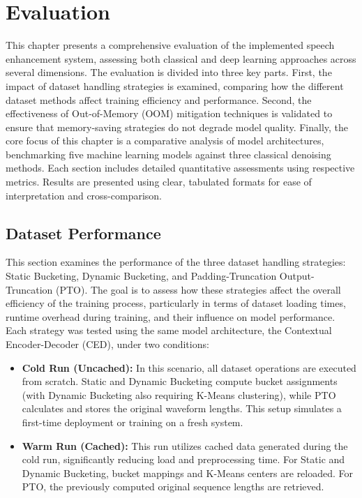 \graphicspath{{content/chapters/7_evaluation/figures/}}
\chapter{Evaluation}
\label{chp:evaluation}

This chapter presents a comprehensive evaluation of the implemented speech enhancement system, assessing both classical and deep learning approaches across several dimensions. The evaluation is divided into three key parts. First, the impact of dataset handling strategies is examined, comparing how the different dataset methods affect training efficiency and performance. Second, the effectiveness of Out-of-Memory (OOM) mitigation techniques is validated to ensure that memory-saving strategies do not degrade model quality. Finally, the core focus of this chapter is a comparative analysis of model architectures, benchmarking five machine learning models against three classical denoising methods. Each section includes detailed quantitative assessments using respective metrics. Results are presented using clear, tabulated formats for ease of interpretation and cross-comparison.

\section{Dataset Performance}
\label{sec:dataset_performance}

This section examines the performance of the three dataset handling strategies: Static Bucketing, Dynamic Bucketing, and Padding-Truncation Output-Truncation (PTO). The goal is to assess how these strategies affect the overall efficiency of the training process, particularly in terms of dataset loading times, runtime overhead during training, and their influence on model performance. Each strategy was tested using the same model architecture, the Contextual Encoder-Decoder (CED), under two conditions:

\begin{itemize}
    \item \textbf{Cold Run (Uncached):} In this scenario, all dataset operations are executed from scratch. Static and Dynamic Bucketing compute bucket assignments (with Dynamic Bucketing also requiring K-Means clustering), while PTO calculates and stores the original waveform lengths. This setup simulates a first-time deployment or training on a fresh system.
    
    \item \textbf{Warm Run (Cached):} This run utilizes cached data generated during the cold run, significantly reducing load and preprocessing time. For Static and Dynamic Bucketing, bucket mappings and K-Means centers are reloaded. For PTO, the previously computed original sequence lengths are retrieved.
\end{itemize}

